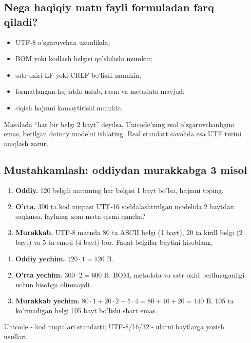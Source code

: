 \documentclass[11pt,a4paper,oneside]{book}
\begin{document}
\subsection{Nega haqiqiy matn fayli formuladan farq qiladi?}
\begin{itemize}
\item UTF-8 o'zgaruvchan uzunlikda;
\item BOM yoki kodlash belgisi qo'shilishi mumkin;
\item satr oxiri LF yoki CRLF bo'lishi mumkin;
\item formatlangan hujjatda uslub, rasm va metadata mavjud;
\item siqish hajmni kamaytirishi mumkin.
\end{itemize}

\begin{attest}
Masalada ``har bir belgi 2 bayt'' deyilsa, Unicode'ning real o'zgaruvchanligini emas, berilgan doimiy modelni ishlating. Real standart savolida esa UTF turini aniqlash zarur.
\end{attest}

\subsection{Mustahkamlash: oddiydan murakkabga 3 misol}
\begin{taskbox}
\begin{enumerate}[leftmargin=7mm]
\item \textbf{Oddiy.} 120 belgili matnning har belgisi 1 bayt bo'lsa, hajmni toping.
\item \textbf{O'rta.} 300 ta kod nuqtasi UTF-16 soddalashtirilgan modelida 2 baytdan saqlansa, faylning xom matn qismi qancha?
\item \textbf{Murakkab.} UTF-8 matnda 80 ta ASCII belgi (1 bayt), 20 ta kirill belgi (2 bayt) va 5 ta emoji (4 bayt) bor. Faqat belgilar baytini hisoblang.
\end{enumerate}
\end{taskbox}

\begin{solutionbox}
\begin{enumerate}[leftmargin=7mm]
\item \textbf{Oddiy yechim.} $120\cdot1=120$ B.
\item \textbf{O'rta yechim.} $300\cdot2=600$ B. BOM, metadata va satr oxiri berilmaganligi uchun hisobga olinmaydi.
\item \textbf{Murakkab yechim.} $80\cdot1+20\cdot2+5\cdot4=80+40+20=140$ B. 105 ta ko'rinadigan belgi 105 bayt bo'lishi shart emas.
\end{enumerate}
\end{solutionbox}
\begin{attest}Unicode - kod nuqtalari standarti; UTF-8/16/32 - ularni baytlarga yozish usullari.\end{attest}
\end{document}
